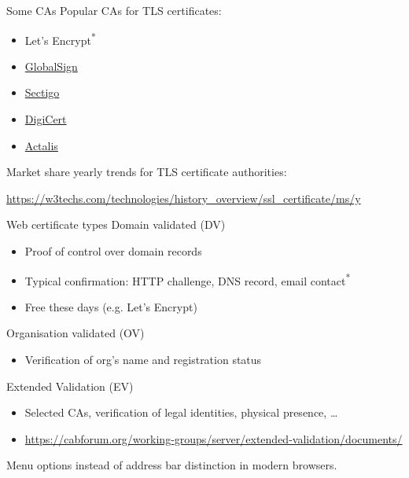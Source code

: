 \begin{frame}{Some CAs}
  Popular CAs for TLS certificates:
  \begin{itemize}[<+(1)->]
    \item Let's Encrypt\textsuperscript{*}
    \item \href{https://www.globalsign.com/en}{GlobalSign}
    \item \href{https://www.sectigo.com}{Sectigo}
    \item \href{https://www.digicert.com}{DigiCert}
    \item \href{https://www.actalis.com}{Actalis}
  \end{itemize}
  
  \vfill

  \pause
  Market share yearly trends for TLS certificate authorities:

  {\scriptsize\url{https://w3techs.com/technologies/history_overview/ssl_certificate/ms/y}}
\end{frame}

\begin{frame}{Web certificate types}
  Domain validated (DV)
  \begin{itemize}[<+(1)->]
    \item Proof of control over domain records
    \item Typical confirmation: HTTP challenge, DNS record, email contact\textsuperscript{*}
    \item Free these days (e.g. Let's Encrypt)
  \end{itemize}

  \pause
  Organisation validated (OV)
  \begin{itemize}[<+(1)->]
    \item Verification of org's name and registration status
  \end{itemize}

  \pause
  Extended Validation (EV)
  \begin{itemize}[<+(1)->]
    \item Selected CAs, verification of legal identities, physical presence, \dots
    \item {\scriptsize\url{https://cabforum.org/working-groups/server/extended-validation/documents/}}
  \end{itemize}

  \pause
  Menu options instead of address bar distinction in modern browsers.
\end{frame}

